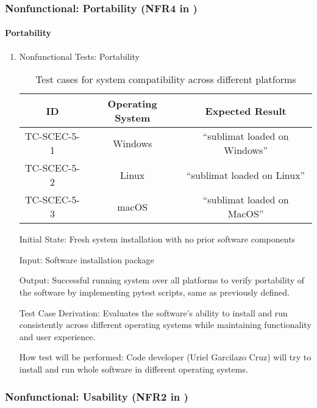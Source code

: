 \documentclass[12pt, titlepage]{article}
\begin{document}
\subsubsection{Nonfunctional: Portability (NFR4 in \citet{SRS})}
\paragraph{Portability}

\begin{enumerate}
  \item{Nonfunctional Tests: Portability}
  \begin{table}[h]
    \centering
    \begin{tabular}{|c|c|c|}
      \hline
      ID & Operating System & Expected Result \\
      \hline
      TC-SCEC-5-1 & Windows & ``sublimat loaded on Windows'' \\
      \hline
      TC-SCEC-5-2 & Linux & ``sublimat loaded on Linux'' \\
      \hline
      TC-SCEC-5-3 & macOS & ``sublimat loaded on MacOS'' \\
      \hline
    \end{tabular}
    \caption{Test cases for system compatibility across different platforms}
    \label{tab:test-case-portability}
  \end{table}

Initial State: Fresh system installation with no prior software components

Input: Software installation package

Output: Successful running system over all platforms to verify portability of the software by implementing pytest 
scripts, same as previously defined.

Test Case Derivation: Evaluates the software's ability to install and run consistently across different operating systems while maintaining functionality and user experience.

How test will be performed: Code developer (Uriel Garcilazo Cruz) will try to install and run whole software in different operating systems.
\end{enumerate}
  


\subsubsection{Nonfunctional: Usability (NFR2 in \citet{SRS})}
\end{document}
